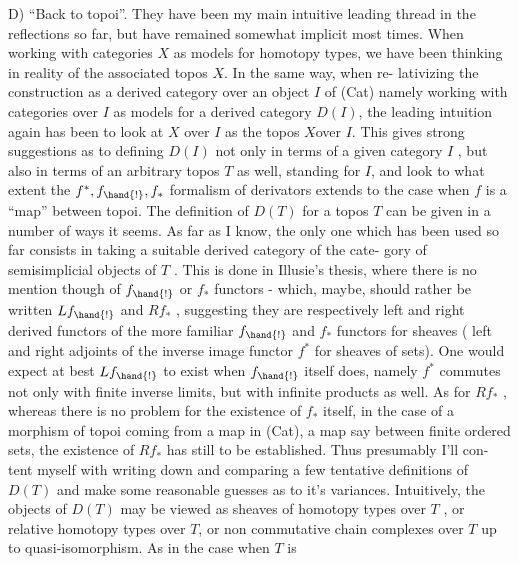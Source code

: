 D) ``Back to topoi''.  They have been my main intuitive leading thread in
the reflections so far,  but have remained somewhat implicit most times.
When working with categories  $X$ as models for homotopy types,  we have been
thinking in reality of the associated topos $X\hat{}$.  In the same way,  when re-%
lativizing the  construction  as a derived category over an object $I$
of (Cat)\hand{,}  namely working with categories over $I$ as models for a derived
category $D(I)$,  the leading intuition again has been to look at $X$ over $I$
as the topos $X\hat{}$\hand{/}over $I\hat{}$.  This gives strong suggestions as to defining
$D(I)$ not only in terms of a given category $I$ ,  but also in terms of an
arbitrary topos $T$  as well,  standing for $I\hat{}$,  and look to what extent the
$f^{*},f_{\hand{!}},f_{*}$  formalism of derivators extends to the case when $f$ is a ``map''
between topoi.  The definition of  $D(T)$ for a topos $T$ can be given in a
number of ways it seems.  As far as I know,  the only one which has been
 used so far consists in taking  a suitable derived category of the cate-%
gory of semisimplicial objects of $T$ .  This is done in Illusie's thesis,
where there is no mention though of $f_{\hand{!}}$ or $f_{*}$ functors  -  which,  maybe,
should rather be written $Lf_{\hand{!}}$  and $Rf_{*}$ ,  suggesting they are respectively
left and right derived functors of the more familiar $f_{\hand{!}}$ and $f_{*}$  functors
for sheaves ( left and right adjoints of the inverse image functor $f^{*}$  for
sheaves of sets).  One would expect\hand{,} at  best\hand{,} $Lf_{\hand{!}}$  to exist when $f_{\hand{!}}$ itself
does,  namely  $f^{*}$  commutes not only with finite inverse limits,  but with
infinite products as well.  As for $Rf_{*}$ ,  whereas there is no problem for
the existence of $f_{*}$ itself,    in the case of a morphism of topoi
coming from a map in (Cat),  a map say between finite ordered sets,  the
existence of $Rf_{*}$  has still to be established.  Thus presumably I'll con-%
tent myself with writing down and comparing a few tentative definitions of
$D(T)$ and make some reasonable guesses as to it's  variances.
Intuitively,  the objects of $D(T)$  may be viewed as sheaves of homotopy
types over $T$ , or relative homotopy types over $T$,  or non commutative
chain complexes over $T$ up to quasi-isomorphism.  As in the case when $T$ is

